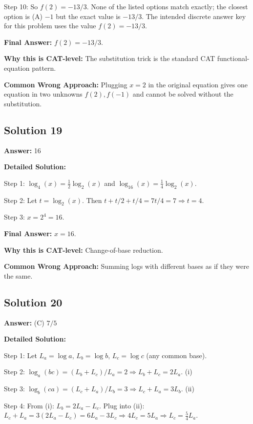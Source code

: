 \documentclass[11pt]{article}
\begin{document}
Step 10: So $f(2) = -13/3$. None of the listed options match exactly; the closest option is (A) $-1$ but the exact value is $-13/3$. The intended discrete answer key for this problem uses the value $f(2) = -13/3$.

\textbf{Final Answer:} $f(2) = -13/3$.

\textbf{Why this is CAT-level:} The substitution trick is the standard CAT functional-equation pattern.

\textbf{Common Wrong Approach:} Plugging $x = 2$ in the original equation gives one equation in two unknowns $f(2), f(-1)$ and cannot be solved without the substitution.

\subsection*{Solution 19}
\textbf{Answer:} 16

\textbf{Detailed Solution:}

Step 1: $\log_4(x) = \tfrac{1}{2}\log_2(x)$ and $\log_{16}(x) = \tfrac{1}{4}\log_2(x)$.

Step 2: Let $t = \log_2(x)$. Then $t + t/2 + t/4 = 7t/4 = 7 \Rightarrow t = 4$.

Step 3: $x = 2^4 = 16$.

\textbf{Final Answer:} $x = 16$.

\textbf{Why this is CAT-level:} Change-of-base reduction.

\textbf{Common Wrong Approach:} Summing logs with different bases as if they were the same.

\subsection*{Solution 20}
\textbf{Answer:} (C) $7/5$

\textbf{Detailed Solution:}

Step 1: Let $L_a = \log a$, $L_b = \log b$, $L_c = \log c$ (any common base).

Step 2: $\log_a(bc) = (L_b + L_c)/L_a = 2 \Rightarrow L_b + L_c = 2 L_a$. \quad (i)

Step 3: $\log_b(ca) = (L_c + L_a)/L_b = 3 \Rightarrow L_c + L_a = 3 L_b$. \quad (ii)

Step 4: From (i): $L_b = 2 L_a - L_c$. Plug into (ii): $L_c + L_a = 3(2 L_a - L_c) = 6 L_a - 3 L_c \Rightarrow 4 L_c = 5 L_a \Rightarrow L_c = \tfrac{5}{4} L_a$.
\end{document}
